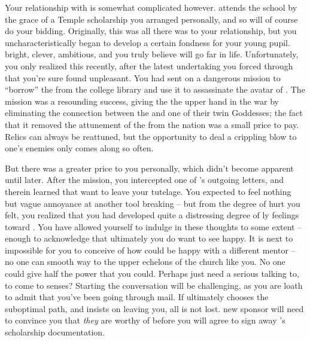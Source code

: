 \documentclass[char]{GL2020}
\begin{document}
Your relationship with \cScholarship{} is somewhat complicated however. \cScholarship{} attends the school by the grace of a Temple scholarship you arranged personally, and so will of course do your bidding. Originally, this was all there was to your relationship, but you uncharacteristically began to develop a certain fondness for your young pupil. \cScholarship{\theyare} bright, clever, ambitious, and you truly believe \cScholarship{\they} will go far in life. Unfortunately, you only realized this recently, after the latest undertaking you forced \cScholarship{\them} through that you're sure \cScholarship{\they} found unpleasant. You had sent \cScholarship{} on a dangerous mission to ``borrow'' the \iScythe{} from the college library and use it to assassinate the avatar of \cEbbFull{}. The mission was a resounding success, giving the \pTech{} the upper hand in the war by eliminating the connection between the \pShip{} and one of their twin Goddesses; the fact that it removed the attunement of the \iScythe{} from the \pFarm{} nation was a small price to pay. Relics can always be reattuned, but the opportunity to deal a crippling blow to one's enemies only comes along so often. 

But there was a greater price to you personally, which didn't become apparent until later. After the mission, you intercepted one of \cScholarship{}'s outgoing letters, and therein learned that \cScholarship{\they} want\cScholarship{\plural} to leave your tutelage. You expected to feel nothing but vague annoyance at another tool breaking -- but from the degree of hurt you felt, you realized that you had developed quite a distressing degree of \cAntiChup{\parent}ly feelings toward \cScholarship{\them}. You have allowed yourself to indulge in these thoughts to some extent -- enough to acknowledge that ultimately you do want to see \cScholarship{} happy. It is next to impossible for you to conceive of how \cScholarship{\they} could be happy with a different mentor -- no one can smooth \cScholarship{\their} way to the upper echelons of the church like you. No one could give \cScholarship{\them} half the power that you could. Perhaps \cScholarship{\they} just need\cScholarship{\plural} a serious talking to, to come to \cScholarship{\their} senses? Starting the conversation will be challenging, as you are loath to admit that you've been going through \cScholarship{\their} mail. If ultimately \cScholarship{} chooses the suboptimal path, and insists on leaving you, all is not lost. \cScholarship{\Their} new sponsor will need to convince you that \emph{they} are worthy of \cScholarship{} before you will agree to sign away \cScholarship{}'s scholarship documentation.
\end{document}
